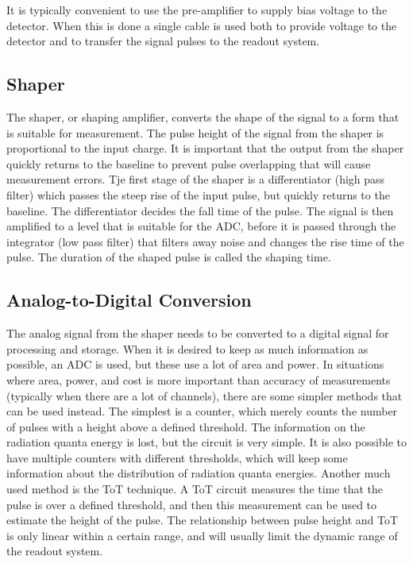 \documentclass[../main/thesis.tex]{subfiles}
\begin{document}
It is typically convenient to use the pre-amplifier to supply bias voltage to the detector. When this is done a single cable is used both to provide voltage to the detector and to transfer the signal pulses to the readout system. \citep[chap. 16]{Knoll}

\subsection{Shaper}
\label{t-shaper}
The shaper, or shaping amplifier, converts the shape of the signal to a form that is suitable for measurement. The pulse height of the signal from the shaper is proportional to the input charge. It is important that the output from the shaper quickly returns to the baseline to prevent pulse overlapping that will cause measurement errors. Tje first stage of the shaper is a differentiator (high pass filter) which passes the steep rise of the input pulse, but quickly returns to the baseline. The differentiator decides the fall time of the pulse. The signal is then amplified to a level that is suitable for the \gls{ADC}, before it is passed through the integrator (low pass filter) that filters away noise and changes the rise time of the pulse. The duration of the shaped pulse is called the shaping time. \citep[chap. 16]{Knoll}


\subsection{Analog-to-Digital Conversion}
\label{t-adc}
The analog signal from the shaper needs to be converted to a digital signal for processing and storage. When it is desired to keep as much information as possible, an \gls{ADC} is used, but these use a lot of area and power. In situations where area, power, and cost is more important than accuracy of measurements (typically when there are a lot of channels), there are some simpler methods that can be used instead. The simplest is a counter, which merely counts the number of pulses with a height above a defined threshold. The information on the radiation quanta energy is lost, but the circuit is very simple. It is also possible to have multiple counters with different thresholds, which will keep some information about the distribution of radiation quanta energies. Another much used method is the \gls{ToT} technique. A \gls{ToT} circuit measures the time that the pulse is over a defined threshold, and then this measurement can be used to estimate the height of the pulse. The relationship between pulse height and \gls{ToT} is only linear within a certain range, and will usually limit the dynamic range of the readout system. \citep[chap. 6]{ToT}
\end{document}
